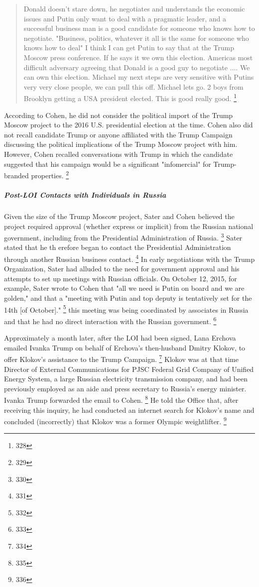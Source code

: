 \begin{quote}
Donald doesn't stare down, he negotiates and understands the economic issues and Putin only want to deal with a pragmatic leader, and a successful business man is a good candidate for someone who knows how to negotiate.
"Business, politics, whatever it all is the same for someone who knows how to deal"
I think I can get Putin to say that at the Trump Moscow press conference.
If he says it we own this election.
Americas most difficult adversary agreeing that Donald is a good guy to negotiate ....
We can own this election.
Michael my next steps are very sensitive with Putins very very close people, we can pull this off.
Michael lets go.
2 boys from Brooklyn getting a USA president elected.
This is good really good.%
\footnote{328}
\end{quote}

According to Cohen, he did not consider the political import of the Trump Moscow project to the 2016 U.S. presidential election at the time.
Cohen also did not recall candidate Trump or anyone affiliated with the Trump Campaign discussing the political implications of the Trump Moscow project with him.
However, Cohen recalled conversations with Trump in which the candidate suggested that his campaign would be a significant "infomercial" for Trump-branded properties.%
\footnote{329}

\subparagraph{Post-LOI Contacts with Individuals in Russia}

Given the size of the Trump Moscow project, Sater and Cohen believed the project required approval (whether express or implicit) from the Russian national government, including from the Presidential Administration of Russia.%
\footnote{330}
Sater stated that he th erefore began to contact the Presidential Administration through another Russian business contact.%
\footnote{331}
In early negotiations with the Trump Organization, Sater had alluded to the need for government approval and his attempts to set up meetings with Russian officials.
On October 12, 2015, for example, Sater wrote to Cohen that "all we need is Putin on board and we are golden," and that a "meeting with Putin and top deputy is tentatively set for the 14th [of October]."%
\footnote{332}
 this meeting was being coordinated by associates in Russia and that he had no direct interaction with the Russian government.%
\footnote{333}

Approximately a month later, after the LOI had been signed, Lana Erchova emailed Ivanka Trump on behalf of Erchova's then-husband Dmitry Klokov, to offer Klokov's assistance to the Trump Campaign.%
\footnote{334}
Klokov was at that time Director of External Communications for PJSC Federal Grid Company of Unified Energy System, a large Russian electricity transmission company, and had been previously employed as an aide and press secretary to Russia's energy minister.
Ivanka Trump forwarded the email to Cohen.%
\footnote{335}
He told the Office that, after receiving this inquiry, he had conducted an internet search for Klokov's name and concluded (incorrectly) that Klokov was a former Olympic weightlifter.%
\footnote{336}

